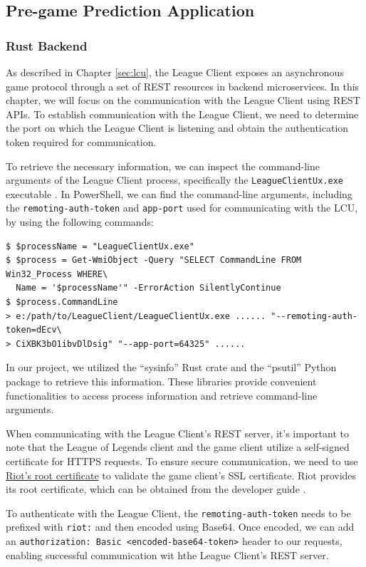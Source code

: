 \documentclass[11pt,a4paper,oneside]{report}
\begin{document}
\subsection{Pre-game Prediction Application}
\subsubsection{Rust Backend}
\label{sec:rust_backend}

As described in Chapter \ref{sec:lcu}, the League Client exposes an asynchronous game protocol through a set of REST resources in backend microservices. In this chapter, we will focus on the communication with the League Client using REST APIs. To establish communication with the League Client, we need to determine the port on which the League Client is listening and obtain the authentication token required for communication.

To retrieve the necessary information, we can inspect the command-line arguments of the League Client process, specifically the \texttt{LeagueClientUx.exe} executable \cite{ray-2022}. In PowerShell, we can find the command-line arguments, including the \texttt{remoting-auth-token} and \texttt{app-port} used for communicating with the LCU, by using the following commands:
\begin{verbatim}
$ $processName = "LeagueClientUx.exe"
$ $process = Get-WmiObject -Query "SELECT CommandLine FROM Win32_Process WHERE\
  Name = '$processName'" -ErrorAction SilentlyContinue
$ $process.CommandLine
> e:/path/to/LeagueClient/LeagueClientUx.exe ...... "--remoting-auth-token=dEcv\
> CiXBK3bO1ibvDlDsig" "--app-port=64325" ......
\end{verbatim}

In our project, we utilized the ``sysinfo'' Rust crate and the ``psutil'' Python package to retrieve this information. These libraries provide convenient functionalities to access process information and retrieve command-line arguments.

When communicating with the League Client's REST server, it's important to note that the League of Legends client and the game client utilize a self-signed certificate for HTTPS requests. To ensure secure communication, we need to use \href{https://static.developer.riotgames.com/docs/lol/riotgames.pem}{Riot's root certificate} to validate the game client's SSL certificate. Riot provides its root certificate, which can be obtained from the developer guide \cite{riot-lol-docs}.

To authenticate with the League Client, the \texttt{remoting-auth-token} needs to be prefixed with \texttt{riot:} and then encoded using Base64. Once encoded, we can add an \texttt{authorization: Basic <encoded-base64-token>} header to our requests, enabling successful communication wit hthe League Client's REST server.
\end{document}
